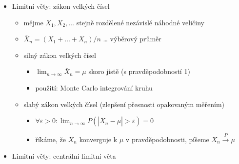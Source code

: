 \begin{itemize}
\begin{itemize}
\item obecné normální rozdělení
\begin{itemize}
\item $N(\mu,\sigma^2)$
\item $f_X(x)=\frac 1{\sigma\sqrt{2\pi}}e^{-\frac12(\frac{x-\mu}{\sigma})^2}$
\item máme-li $X\sim N(\mu,\sigma^2)$, pak pro $Z=\frac{X-\mu}\sigma$ platí $Z\sim N(0,1)$
\item pro normální nezávislé náhodné veličiny $X_i\sim N(\mu_i,\sigma_i^2)$ (nechť je jich konečně) je i součet normální náhodná veličina $\sum X_i\sim N(\sum\mu_i,\sum\sigma_i^2)$
\item pravidlo $3\sigma$
\begin{itemize}
\item $P(\mu-\sigma\lt X\lt\mu+\sigma)\doteq 0.68$
\item $P(\mu-2\sigma\lt X\lt\mu+2\sigma)\doteq 0.95$
\item $P(\mu-3\sigma\lt X\lt\mu+3\sigma)\doteq 0.997$
\end{itemize}
\end{itemize}
\end{itemize}
\item Limitní věty: zákon velkých čísel
\begin{itemize}
\item mějme $X_1,X_2,\dots$ stejně rozdělené nezávislé náhodné veličiny
\item $\bar X_n=(X_1+\dots+X_n)/n$ \dots{} výběrový průměr
\item silný zákon velkých čísel
\begin{itemize}
\item $\lim_{n\to\infty}\bar X_n=\mu$ skoro jistě (s pravděpodobností 1)
\item použití: Monte Carlo integrování kruhu
\end{itemize}
\item slabý zákon velkých čísel (zlepšení přesnosti opakovaným měřením)
\begin{itemize}
\item $\forall\varepsilon\gt 0:\lim_{n\to\infty} P(|\bar X_n-\mu|\gt\varepsilon)=0$
\item říkáme, že $\bar X_n$ konverguje k $\mu$ v pravděpodobnosti, píšeme $\bar X_n\xrightarrow P\mu$
\end{itemize}
\end{itemize}
\item Limitní věty: centrální limitní věta
\begin{itemize}

\end{itemize}
\end{itemize}
